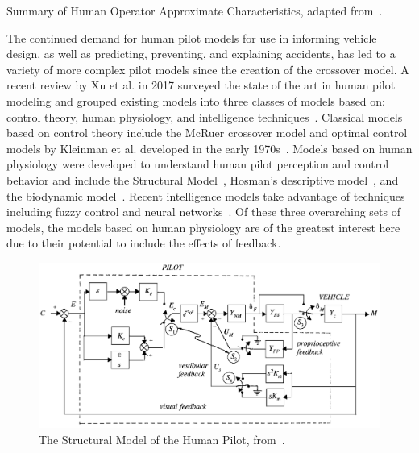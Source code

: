 \begin{table}[tb]
    \centering
    \caption[Summary of Human Operator Approximate Characteristics]{Summary of Human Operator Approximate Characteristics, adapted from~\citet{mcruer_mathematical_1974}.}
    \label{table:mcruer1974b}
\end{table}

The continued demand for human pilot models for use in informing vehicle design, as well as predicting, preventing, and explaining accidents, has led to a variety of more complex pilot models since the creation of the crossover model.
A recent review by Xu et al. in 2017 surveyed the state of the art in human pilot modeling and grouped existing models into three classes of models based on: control theory, human physiology, and intelligence techniques~\citep{xu_review_2017}.
Classical models based on control theory include the McRuer crossover model and optimal control models by Kleinman et al. developed in the early 1970s~\citep{kleinman_optimal_1970, baron_optimal_1970}.
Models based on human physiology were developed to understand human pilot perception and control behavior and include the Structural Model~\citep{hess_structural_1980, hess_model_1990, hess_unified_1997}, Hosman's descriptive model~\citep{hosman_pilots_nodate, hosman_pilots_1999}, and the biodynamic model~\citep{griffin_validation_2001}.
Recent intelligence models take advantage of techniques including fuzzy control and neural networks~\citep{zaychik_conspectus_2006, gestwa_modelling_2003}.
Of these three overarching sets of models, the models based on human physiology are of the greatest interest here due to their potential to include the effects of feedback.

\begin{figure}[tb!]
    \begin{center}
        \includegraphics[width=0.8\linewidth]{figures/Introduction/Screen_Shot_2018-07-31_at_11_21_44_AM.png}
        \caption[The Structural Model of the Human Pilot]{The Structural Model of the Human Pilot, from~\citet{hess_unified_1997}.}
        \label{figure:structuralmodel}
    \end{center}
\end{figure}

